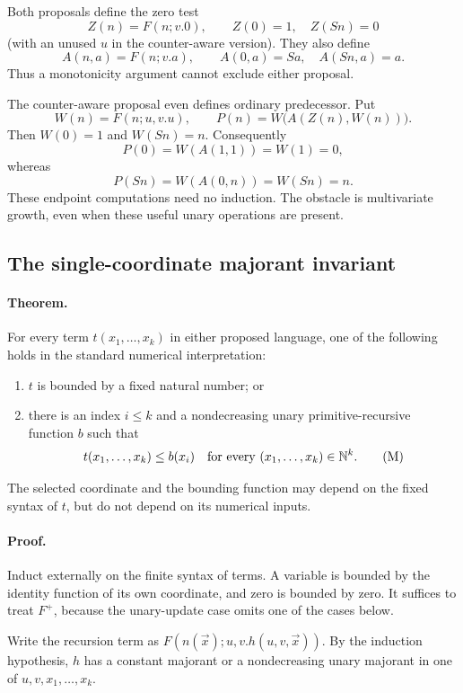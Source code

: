 \documentclass[11pt,letterpaper]{article}
\theoremstyle{definition}\newtheorem{definition}[theorem]{Definition}
\theoremstyle{remark}\newtheorem{remark}[theorem]{Remark}
\begin{document}
Both proposals define the zero test
\[
 Z(n)=F(n;v.0),\qquad Z(0)=1,\quad Z(Sn)=0
\]
(with an unused $u$ in the counter-aware version).  They also define
\[
 A(n,a)=F(n;v.a),\qquad A(0,a)=Sa,\quad A(Sn,a)=a.
\]
Thus a monotonicity argument cannot exclude either proposal.

The counter-aware proposal even defines ordinary predecessor.  Put
\[
 W(n)=F(n;u,v.u),\qquad
 P(n)=W\bigl(A(Z(n),W(n))\bigr).
\]
Then $W(0)=1$ and $W(Sn)=n$.  Consequently
\[
 P(0)=W(A(1,1))=W(1)=0,
\]
whereas
\[
 P(Sn)=W(A(0,n))=W(Sn)=n.
\]
These endpoint computations need no induction.  The obstacle is
multivariate growth, even when these useful unary operations are present.

\subsection{The single-coordinate majorant invariant}

\paragraph{Theorem.}
For every term $t(x_1,\ldots,x_k)$ in either proposed language, one of
the following holds in the standard numerical interpretation:
\begin{enumerate}
\item $t$ is bounded by a fixed natural number; or
\item there is an index $i\leq k$ and a nondecreasing unary
primitive-recursive function $b$ such that
\[
 t(x_1,\ldots,x_k)\leq b(x_i)
 \quad\hbox{for every }(x_1,\ldots,x_k)\in\mathbb N^k.
 \tag{M}
\]
\end{enumerate}
The selected coordinate and the bounding function may depend on the
fixed syntax of $t$, but do not depend on its numerical inputs.

\paragraph{Proof.}
Induct externally on the finite syntax of terms.  A variable is bounded
by the identity function of its own coordinate, and zero is bounded by
zero.  It suffices to treat $F^{+}$, because the unary-update case omits
one of the cases below.

Write the recursion term as $F(n(\vec x);u,v.h(u,v,\vec x))$.
By the induction hypothesis, $h$ has a constant majorant or a
nondecreasing unary majorant in one of $u,v,x_1,\ldots,x_k$.
\end{document}
